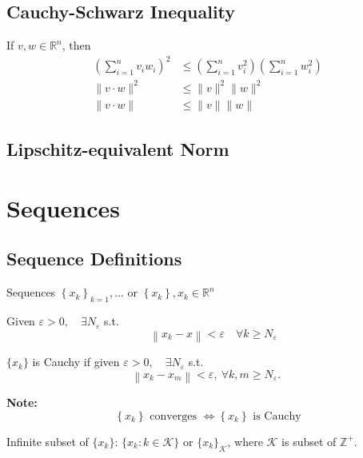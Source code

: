 \documentclass[11pt]{elegantbook}
\begin{document}
\subsection{Cauchy-Schwarz Inequality}
\begin{theorem}
    If $v, w \in \mathbb{R}^n$, then
    $$
    \begin{aligned}
    \left(\sum_{i=1}^n v_i w_i\right)^2 & \leq\left(\sum_{i=1}^n v_i^2\right)\left(\sum_{i=1}^n w_i^2\right) \\
    \|v \cdot w\|^2 & \leq\|v\|^2\|w\|^2 \\
    \|v \cdot w\| & \leq\|v\|\|w\|
    \end{aligned}
    $$
\end{theorem}

\subsection{Lipschitz-equivalent Norm}

\section{Sequences}
\subsection{Sequence Definitions}
Sequences $\left\{x_{k}\right\}_{k=1}, \ldots$ or $\left\{x_{k}\right\}, x_{k} \in \mathbb{R}^{n}$
\begin{definition}[Convergence: note $x_{k} \rightarrow x, \lim _{k \rightarrow \infty} x_{k}=x$]
    Given $\varepsilon>0, \quad \exists N_{\varepsilon}$ s.t. $$\quad\left\|x_{k}-x\right\|<\varepsilon \quad \forall k \geqslant N_{\varepsilon}$$
\end{definition}

\begin{definition}
    $\{x_k\}$ is Cauchy if given $\varepsilon>0, \quad \exists N_{\varepsilon}$ s.t.
    $$\left\|x_{k}-x_{m}\right\|<\varepsilon,\  \forall k, m \geqslant N_{\varepsilon} \text {. }$$
\end{definition}
\textbf{Note:}$$\left\{x_{k}\right\} \text { converges } \Longleftrightarrow\left\{x_{k}\right\} \text { is Cauchy}$$


\begin{definition}[Subsequence]
Infinite subset of $\{x_k\}$: $\{x_k:k\in \mathcal{K} \}\text{ or } \{x_k\}_\mathcal{K} $, where $\mathcal{K} $ is subset of $\mathbb{Z}^+$.
\end{definition}
\end{document}
